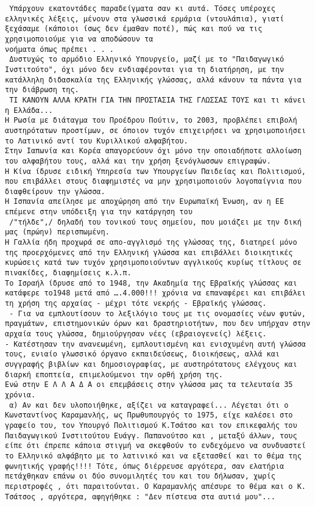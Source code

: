 \documentclass[a4paper]{article}
\begin{document}
\begin{verbatim}
 Υπάρχουν εκατοντάδες παραδείγματα σαν κι αυτά. Τόσες υπέροχες ελληνικές λέξεις, μένουν στα γλωσσικά ερμάρια (ντουλάπια), γιατί ξεχάσαμε (κάποιοι ίσως δεν έμαθαν ποτέ), πώς και πού να τις χρησιμοποιούμε για να αποδώσουν τα
νοήματα όπως πρέπει . . . 
 Δυστυχώς το αρμόδιο Ελληνικό Υπουργείο, μαζί με το "Παιδαγωγικό Ινστιτούτο", όχι μόνο δεν ενδιαφέρονται για τη διατήρηση, με την κατάλληλη διδασκαλία της Ελληνικής γλώσσας, αλλά κάνουν τα πάντα για την διάβρωση της. 
 ΤΙ ΚΑΝΟΥΝ ΑΛΛΑ ΚΡΑΤΗ ΓΙΑ ΤΗΝ ΠΡΟΣΤΑΣΙΑ ΤΗΣ ΓΛΩΣΣΑΣ TΟΥΣ και τι κάνει η Ελλάδα... 
Η Ρωσία με διάταγμα του Προέδρου Πούτιν, το 2003, προβλέπει επιβολή αυστηρότατων προστίμων, σε όποιον τυχόν επιχειρήσει να χρησιμοποιήσει το Λατινικό αντί του Κυριλλικού αλφαβήτου.
Στην Ιαπωνία και Κορέα απαγορεύουν όχι μόνο την οποιαδήποτε αλλοίωση του αλφαβήτου τους, αλλά και την χρήση ξενόγλωσσων επιγραφών.
Η Κίνα ίδρυσε ειδική Υπηρεσία των Υπουργείων Παιδείας και Πολιτισμού, που επιβάλλει στους διαφημιστές να μην χρησιμοποιούν λογοπαίγνια που διαφθείρουν την γλώσσα. 
Η Ισπανία απείλησε με αποχώρηση από την Ευρωπαϊκή Ένωση, αν η ΕΕ επέμενε στην υπόδειξη για την κατάργηση του
 /"τήλδε",/ δηλαδή του τονικού τους σημείου, που μοιάζει με την δική μας (πρώην) περισπωμένη. 
Η Γαλλία ήδη προχωρά σε απο-αγγλισμό της γλώσσας της, διατηρεί μόνο της προερχόμενες από την Ελληνική γλώσσα και επιβάλλει διοικητικές κυρώσεις κατά των τυχόν χρησιμοποιούντων αγγλικούς κυρίως τίτλους σε πινακίδες, διαφημίσεις κ.λ.π. 
Το Ισραήλ ίδρυσε από το 1948, την Ακαδημία της Εβραϊκής γλώσσας και κατάφερε το1948 μετά από ….4.000!!! χρόνια να επαναφέρει και επιβάλει τη χρήση της αρχαίας - μέχρι τότε νεκρής - Εβραϊκής γλώσσας.
 - Για να εμπλουτίσουν το λεξιλόγιο τους με τις ονομασίες νέων φυτών, πραγμάτων, επιστημονικών όρων και δραστηριοτήτων, που δεν υπήρχαν στην αρχαία τους γλώσσα, δημιούργησαν νέες (εβραιογενείς) λέξεις. 
- Κατέστησαν την ανανεωμένη, εμπλουτισμένη και ενισχυμένη αυτή γλώσσα τους, ενιαίο γλωσσικό όργανο εκπαιδεύσεως, διοικήσεως, αλλά και συγγραφής βιβλίων και δημοσιογραφίας, με αυστηρότατους ελέγχους και διαρκή εποπτεία, επιμελούμενοι την ορθή χρήση της. 
Ενώ στην Ε Λ Λ Α Δ Α oι επεμβάσεις στην γλώσσα μας τα τελευταία 35 χρόνια. 
 α) Αν και δεν υλοποιήθηκε, αξίζει να καταγραφεί... Λέγεται ότι ο Κωνσταντίνος Καραμανλής, ως Πρωθυπουργός το 1975, είχε καλέσει στο γραφείο του, τον Υπουργό Πολιτισμού Κ.Τσάτσο και τον επικεφαλής του Παιδαγωγικού Ινστιτούτου Ευάγγ. Παπανούτσο και , μεταξύ άλλων, τους είπε ότι έπρεπε κάποια στιγμή να σκεφθούν το ενδεχόμενο να συνδυαστεί το Ελληνικό αλφάβητο με το λατινικό και να εξετασθεί και το θέμα της φωνητικής γραφής!!!! Τότε, όπως διέρρευσε αργότερα, σαν ελατήρια πετάχθηκαν επάνω οι δύο συνομιλητές του και του δήλωσαν, χωρίς περιστροφές , ότι παραιτούνται. Ο Καραμανλής απέσυρε το θέμα και ο Κ. Τσάτσος , αργότερα, αφηγήθηκε : "Δεν πίστευα στα αυτιά μου"... 

\end{verbatim}
\end{document}
